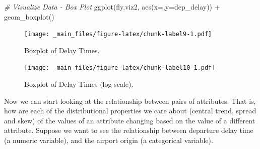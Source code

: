 \documentclass[
]{book}
\newenvironment{Shaded}{\begin{snugshade}}{\end{snugshade}}
\newcommand{\AttributeTok}[1]{\textcolor[rgb]{0.77,0.63,0.00}{#1}}
\newcommand{\CommentTok}[1]{\textcolor[rgb]{0.56,0.35,0.01}{\textit{#1}}}
\newcommand{\ConstantTok}[1]{\textcolor[rgb]{0.00,0.00,0.00}{#1}}
\newcommand{\FunctionTok}[1]{\textcolor[rgb]{0.00,0.00,0.00}{#1}}
\newcommand{\NormalTok}[1]{#1}
\newcommand{\OtherTok}[1]{\textcolor[rgb]{0.56,0.35,0.01}{#1}}
\newcommand{\SpecialCharTok}[1]{\textcolor[rgb]{0.00,0.00,0.00}{#1}}
\newcommand{\StringTok}[1]{\textcolor[rgb]{0.31,0.60,0.02}{#1}}
\begin{document}
\begin{Shaded}
\begin{Highlighting}[]
\CommentTok{\# Visualize Data {-} Box Plot }
\FunctionTok{ggplot}\NormalTok{(fly.viz2, }\FunctionTok{aes}\NormalTok{(}\AttributeTok{x=}\StringTok{\textquotesingle{}\textquotesingle{}}\NormalTok{,}\AttributeTok{y=}\NormalTok{dep\_delay)) }\SpecialCharTok{+} \FunctionTok{geom\_boxplot}\NormalTok{()}
\end{Highlighting}
\end{Shaded}

\begin{figure}
\centering
\texttt{[image: \_main\_files/figure-latex/chunk-label9-1.pdf]}
\caption{\label{fig:chunk-label9}Boxplot of Delay Times.}
\end{figure}

\begin{Shaded}
\end{Shaded}

\begin{figure}
\centering
\texttt{[image: \_main\_files/figure-latex/chunk-label10-1.pdf]}
\caption{\label{fig:chunk-label10}Boxplot of Delay Times (log scale).}
\end{figure}

Now we can start looking at the relationship between pairs of attributes. That is, how are each of the distributional properties we care about (central trend, spread and skew) of the values of an attribute changing based on the value of a different attribute. Suppose we want to see the relationship between departure delay time (a numeric variable), and the airport origin (a categorical variable).
\end{document}
